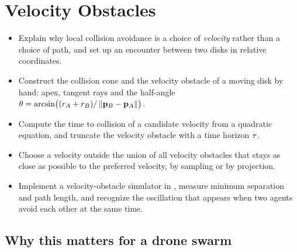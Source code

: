 \chapter{Velocity Obstacles}
\label{ch:ch12}

\begin{objectives}
\begin{itemize}
  \item Explain why local collision avoidance is a choice of \emph{velocity} rather than a choice of path, and set up an encounter between two disks in relative coordinates.
  \item Construct the collision cone and the velocity obstacle of a moving disk by hand: apex, tangent rays and the half-angle $\theta=\arcsin\bigl((r_A+r_B)/\left\lVert \mathbf{p}_B-\mathbf{p}_A \right\rVert\bigr)$.
  \item Compute the time to collision of a candidate velocity from a quadratic equation, and truncate the velocity obstacle with a time horizon $\tau$.
  \item Choose a velocity outside the union of all velocity obstacles that stays as close as possible to the preferred velocity, by sampling or by projection.
  \item Implement a velocity-obstacle simulator in \python, measure minimum separation and path length, and recognize the oscillation that appears when two agents avoid each other at the same time.
\end{itemize}
\end{objectives}

\section{Why this matters for a drone swarm}
\label{sec:ch12-motivation}

